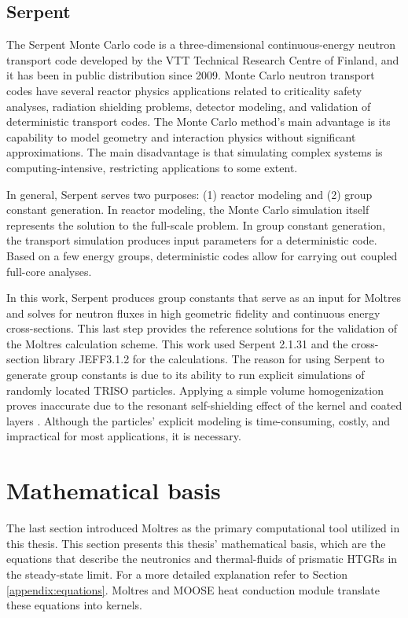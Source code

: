 \subsection{Serpent}
\label{sec:ch3-serpent}

The Serpent Monte Carlo code is a three-dimensional continuous-energy neutron transport code developed by the VTT Technical Research Centre of Finland, and it has been in public distribution since 2009.
Monte Carlo neutron transport codes have several reactor physics applications related to criticality safety analyses, radiation shielding problems, detector modeling, and validation of deterministic transport codes.
The Monte Carlo method's main advantage is its capability to model geometry and interaction physics without significant approximations.
The main disadvantage is that simulating complex systems is computing-intensive, restricting applications to some extent.

In general, Serpent serves two purposes: (1) reactor modeling and (2) group constant generation.
In reactor modeling, the Monte Carlo simulation itself represents the solution to the full-scale problem.
In group constant generation, the transport simulation produces input parameters for a deterministic code.
Based on a few energy groups, deterministic codes allow for carrying out coupled full-core analyses.

In this work, Serpent produces group constants that serve as an input for Moltres and solves for neutron fluxes in high geometric fidelity and continuous energy cross-sections.
This last step provides the reference solutions for the validation of the Moltres calculation scheme.
This work used Serpent 2.1.31 and the cross-section library JEFF3.1.2 for the calculations.
The reason for using Serpent to generate group constants is due to its ability to run explicit simulations of randomly located TRISO particles.
Applying a simple volume homogenization proves inaccurate due to the resonant self-shielding effect of the kernel and coated layers \cite{strydom_results_2015}.
Although the particles' explicit modeling is time-consuming, costly, and impractical for most applications, it is necessary.

\section{Mathematical basis}
\label{sec:ch3-math}

The last section introduced Moltres as the primary computational tool utilized in this thesis.
This section presents this thesis' mathematical basis, which are the equations that describe the neutronics and thermal-fluids of prismatic HTGRs in the steady-state limit.
For a more detailed explanation refer to Section \ref{appendix:equations}.
Moltres and MOOSE heat conduction module translate these equations into kernels.

